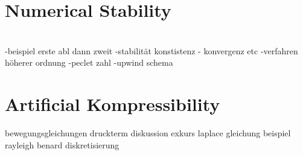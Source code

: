 \section{Numerical Stability}\mbox{}\\

-beispiel erste abl dann zweit
-stabilität konstistenz - konvergenz etc
-verfahren höherer ordnung
-peclet zahl
-upwind schema



\newpage

\section{Artificial Kompressibility}
bewegungsgleichungen
druckterm diskussion
exkurs laplace gleichung
beispiel rayleigh benard diskretisierung


